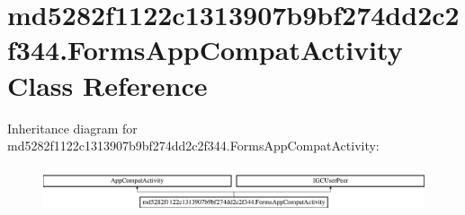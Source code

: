 \hypertarget{classmd5282f1122c1313907b9bf274dd2c2f344_1_1FormsAppCompatActivity}{}\section{md5282f1122c1313907b9bf274dd2c2f344.\+Forms\+App\+Compat\+Activity Class Reference}
\label{classmd5282f1122c1313907b9bf274dd2c2f344_1_1FormsAppCompatActivity}
Inheritance diagram for md5282f1122c1313907b9bf274dd2c2f344.\+Forms\+App\+Compat\+Activity\+:\begin{figure}[H]
\begin{center}
\leavevmode
\includegraphics[height=1.386139cm]{classmd5282f1122c1313907b9bf274dd2c2f344_1_1FormsAppCompatActivity}
\end{center}
\end{figure}
